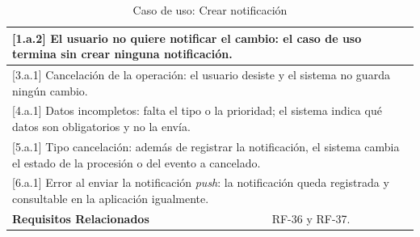\begin{table}[h!]
\begin{tabular}{|p{4cm}|p{11cm}|}
        \hline
        \multicolumn{2}{|p{15cm}|}{ [1.a.2] El usuario no quiere notificar el cambio: el caso de uso termina sin crear ninguna notificación. } \\
        \hline
        \multicolumn{2}{|p{15cm}|}{ [3.a.1] Cancelación de la operación: el usuario desiste y el sistema no guarda ningún cambio. } \\
        \hline
        \multicolumn{2}{|p{15cm}|}{ [4.a.1] Datos incompletos: falta el tipo o la prioridad; el sistema indica qué datos son obligatorios y no la envía. } \\
        \hline
        \multicolumn{2}{|p{15cm}|}{ [5.a.1] Tipo cancelación: además de registrar la notificación, el sistema cambia el estado de la procesión o del evento a cancelado. } \\
        \hline
        \multicolumn{2}{|p{15cm}|}{ [6.a.1] Error al enviar la notificación \emph{push}: la notificación queda registrada y consultable en la aplicación igualmente. } \\
        \hline
        \textbf{Requisitos Relacionados} & RF-36 y RF-37. \\
        \hline
    \end{tabular}
    \caption{Caso de uso: Crear notificación}
\end{table}

